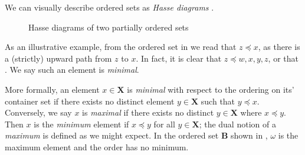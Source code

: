 We can visually describe ordered sets as \textit{Hasse diagrams} \cite{Huth_Ryan_2004}. 

\begin{figure}[H]
	\centering
	\small
	\begin{subfigure}
		{0.3\textwidth}
		\centering
		 \label{subfigure:partial-order-a}
	\end{subfigure}%
	\begin{subfigure}
		{0.3\textwidth}
		\centering
		 \label{subfigure:partial-order-b}
	\end{subfigure}%
	\caption{Hasse diagrams of two partially ordered sets}
	\label{figure:hasse-diagram}
\end{figure}

As an illustrative example, from the ordered set in  we read that $z \preceq x$, as
there is a (strictly) upward path from $z$ to $x$. In fact, it is clear that $z \preceq w, x,y,z$, or that .
We say such an element is \textit{minimal}.

More formally, an element $x \in \mathbf{X}$ is \textit{minimal} with respect to the ordering on its' container set if there
exists no distinct element $y \in \mathbf{X}$ such that $y \preceq x$. Conversely, we say $x$ is \textit{maximal} if
there exists no distinct $y \in \mathbf{X}$ where $x \preceq y$. Then $x$ is the \textit{minimum} element if
$x \preceq y$ for all $y \in \mathbf{X}$; the dual notion of a \textit{maximum} is defined as we might expect. In the ordered
set $\mathbf{B}$ shown in , $\omega$ is the maximum element and the order has no minimum.
   

